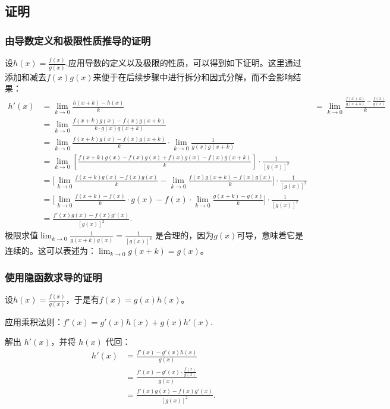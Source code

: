 \subsection{证明}
\subsubsection{由导数定义和极限性质推导的证明}
设$h(x) = \frac{f(x)}{g(x)}$.应用导数的定义以及极限的性质，可以得到如下证明。这里通过添加和减去$f(x)g(x)$来便于在后续步骤中进行拆分和因式分解，而不会影响结果：
$$
\begin{aligned}
h'(x) &= \lim_{k \to 0} \frac{h(x+k) - h(x)}{k}
&= \lim_{k \to 0} \frac{\tfrac{f(x+k)}{g(x+k)} - \tfrac{f(x)}{g(x)}}{k}\\
&= \lim_{k \to 0} \frac{f(x+k)g(x) - f(x)g(x+k)}{k \cdot g(x)g(x+k)}\\
&= \lim_{k \to 0} \frac{f(x+k)g(x) - f(x)g(x+k)}{k} \cdot \lim_{k \to 0} \frac{1}{g(x)g(x+k)}\\
\
&= \lim_{k \to 0} \left[ \frac{f(x+k)g(x) - f(x)g(x) + f(x)g(x) - f(x)g(x+k)}{k} \right] \cdot \frac{1}{[g(x)]^2}\\
&= \Bigg[\lim_{k \to 0} \frac{f(x+k)g(x) - f(x)g(x)}{k} - \lim_{k \to 0} \frac{f(x)g(x+k) - f(x)g(x)}{k}\Bigg] \cdot \frac{1}{[g(x)]^2}\\
&= \Bigg[\lim_{k \to 0} \frac{f(x+k) - f(x)}{k}\cdot g(x) - f(x) \cdot \lim_{k \to 0} \frac{g(x+k) - g(x)}{k}\Bigg] \cdot \frac{1}{[g(x)]^2}\\
&= \frac{f'(x)g(x) - f(x)g'(x)}{[g(x)]^2}.
\end{aligned}~
$$
极限求值$\lim_{k \to 0} \frac{1}{g(x+k)g(x)} = \frac{1}{[g(x)]^2}$
是合理的，因为$g(x)$可导，意味着它是连续的。这可以表述为：$\lim_{k \to 0} g(x+k) = g(x)$。
\subsubsection{使用隐函数求导的证明}
设$h(x) = \frac{f(x)}{g(x)}$，于是有$f(x) = g(x)h(x)$。

应用乘积法则：$f'(x) = g'(x)h(x) + g(x)h'(x)$.

解出 $h'(x)$，并将 $h(x)$ 代回：
$$
\begin{aligned}
h'(x) &= \frac{f'(x) - g'(x)h(x)}{g(x)}\\
&= \frac{f'(x) - g'(x)\cdot \tfrac{f(x)}{g(x)}}{g(x)}\\
&= \frac{f'(x)g(x) - f(x)g'(x)}{[g(x)]^2}.
\end{aligned}~
$$

